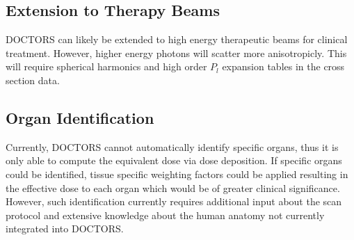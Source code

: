\subsection{Extension to Therapy Beams}
DOCTORS can likely be extended to high energy therapeutic beams for clinical treatment. However, higher energy photons will scatter more anisotropicly. This will require spherical harmonics and high order $P_l$ expansion tables in the cross section data.

\subsection{Organ Identification}
Currently, DOCTORS cannot automatically identify specific organs, thus it is only able to compute the equivalent dose via dose deposition. If specific organs could be identified, tissue specific weighting factors could be applied resulting in the effective dose to each organ which would be of greater clinical significance. However, such identification currently requires additional input about the scan protocol and extensive knowledge about the human anatomy not currently integrated into DOCTORS.

\endinput
